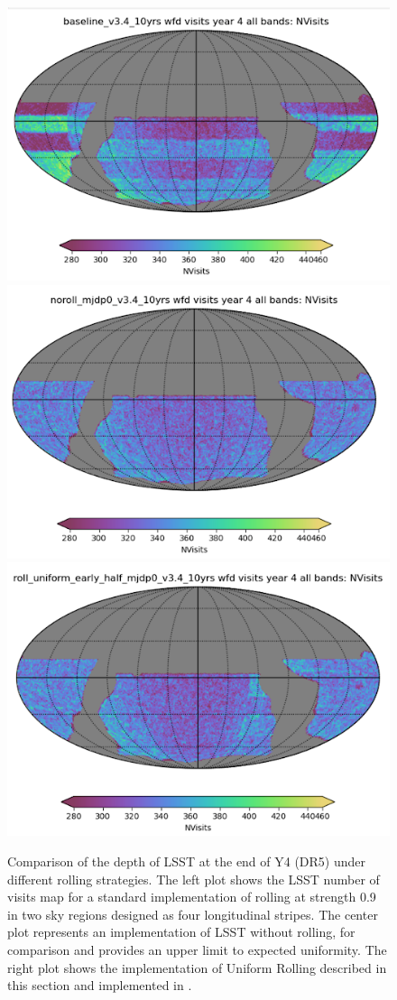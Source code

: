 \begin{figure}
    \centering
    \includegraphics[width=0.3\linewidth]{figures/Rolling.png}
    \includegraphics[width=0.3\linewidth]{figures/RollingCompare.png}
    \includegraphics[width=0.3\linewidth]{figures/RollingUniform.png}
    \caption{
Comparison of the depth of LSST at the end of Y4 (DR5) under different rolling strategies. The left plot shows the LSST number of visits map for a standard implementation of rolling at strength 0.9 in two sky regions designed as four longitudinal stripes. The center plot represents an implementation of LSST without rolling, for comparison and provides an upper limit to expected uniformity. The right plot shows the implementation of Uniform Rolling described in this section and implemented in .}
    \label{fig:uniform-rolling}
\end{figure}

\FloatBarrier



